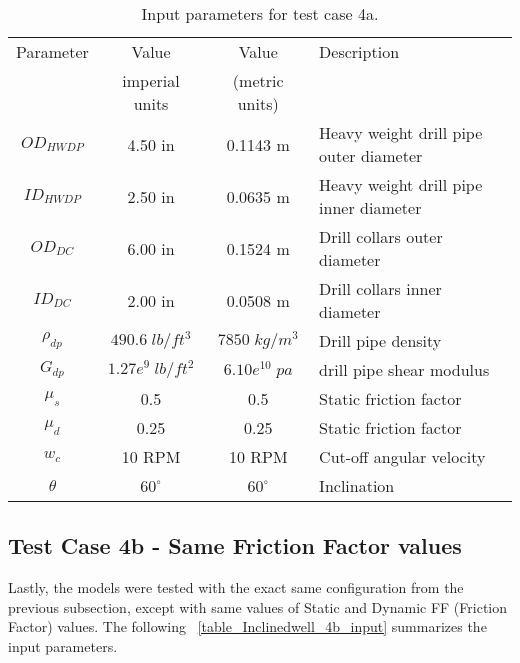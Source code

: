  \begin{table}[h]
\centering
   \begin{tabular}{|c|c|c|p{2.75in}|}
   \hline
   Parameter & Value  & Value & Description\\                                                              
     & imperial units &  (metric units) & \\                                                              
   \hline
   $OD_{HWDP}$ & 4.50 in & 0.1143 m & Heavy weight drill pipe outer diameter \\
   \hline
   $ID_{HWDP}$ & 2.50 in & 0.0635 m & Heavy weight drill pipe inner diameter \\
   \hline
   $OD_{DC}$ & 6.00 in & 0.1524 m & Drill collars outer diameter \\
   \hline
   $ID_{DC}$ & 2.00 in & 0.0508 m & Drill collars inner diameter \\                                                    
   \hline
   $\rho_{dp}$ & $490.6\;lb/ft^3$ & $7850\;kg/m^3$ & Drill pipe density \\                                                  
   \hline
   $G_{dp}$ & $1.27e^{9}\;lb/ft^2$ & $6.10e^{10}\;pa$ & drill pipe shear modulus\\                                                              
   \hline
   $\mu_{s}$ & 0.5 & 0.5 & Static friction factor\\
   \hline
   $\mu_{d}$ & 0.25 & 0.25 & Static friction factor\\
   \hline
   $w_c$ & 10 RPM & 10 RPM & Cut-off angular velocity\\
   \hline
   $\theta$ & $60^{\circ}$ & $60^{\circ}$ & Inclination\\
   \hline
   \end{tabular}
\caption[Input parameters for test case 4a.]{Input parameters for test case 4a.}\label{table_Inclinedwell_4a_input}
\end{table}

\subsection{Test Case 4b - Same Friction Factor values}

Lastly, the models were tested with the exact same configuration from the previous subsection, except with same values of Static and Dynamic FF (Friction Factor) values. The following \tablename~\ref{table_Inclinedwell_4b_input} summarizes the input parameters. 

